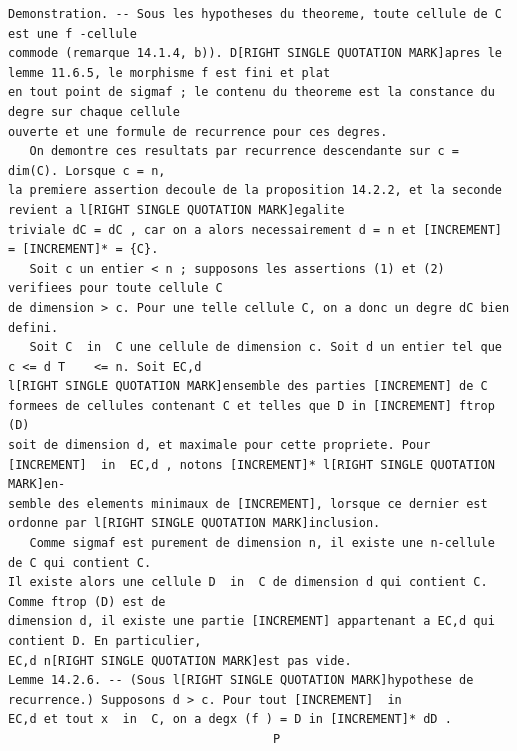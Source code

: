 \documentclass[
  11pt,
]{article}
\begin{document}
\begin{lstlisting}
Demonstration. -- Sous les hypotheses du theoreme, toute cellule de C est une f -cellule
commode (remarque 14.1.4, b)). D[RIGHT SINGLE QUOTATION MARK]apres le lemme 11.6.5, le morphisme f est fini et plat
en tout point de sigmaf ; le contenu du theoreme est la constance du degre sur chaque cellule
ouverte et une formule de recurrence pour ces degres.
   On demontre ces resultats par recurrence descendante sur c = dim(C). Lorsque c = n,
la premiere assertion decoule de la proposition 14.2.2, et la seconde revient a l[RIGHT SINGLE QUOTATION MARK]egalite
triviale dC = dC , car on a alors necessairement d = n et [INCREMENT] = [INCREMENT]* = {C}.
   Soit c un entier < n ; supposons les assertions (1) et (2) verifiees pour toute cellule C
de dimension > c. Pour une telle cellule C, on a donc un degre dC bien defini.
   Soit C  in  C une cellule de dimension c. Soit d un entier tel que c <= d T    <= n. Soit EC,d
l[RIGHT SINGLE QUOTATION MARK]ensemble des parties [INCREMENT] de C formees de cellules contenant C et telles que D in [INCREMENT] ftrop (D)
soit de dimension d, et maximale pour cette propriete. Pour [INCREMENT]  in  EC,d , notons [INCREMENT]* l[RIGHT SINGLE QUOTATION MARK]en-
semble des elements minimaux de [INCREMENT], lorsque ce dernier est ordonne par l[RIGHT SINGLE QUOTATION MARK]inclusion.
   Comme sigmaf est purement de dimension n, il existe une n-cellule de C qui contient C.
Il existe alors une cellule D  in  C de dimension d qui contient C. Comme ftrop (D) est de
dimension d, il existe une partie [INCREMENT] appartenant a EC,d qui contient D. En particulier,
EC,d n[RIGHT SINGLE QUOTATION MARK]est pas vide.
Lemme 14.2.6. -- (Sous l[RIGHT SINGLE QUOTATION MARK]hypothese de recurrence.) Supposons d > c. Pour tout [INCREMENT]  in 
EC,d et tout x  in  C, on a degx (f ) = D in [INCREMENT]* dD .
                                     P


\end{lstlisting}
\end{document}

